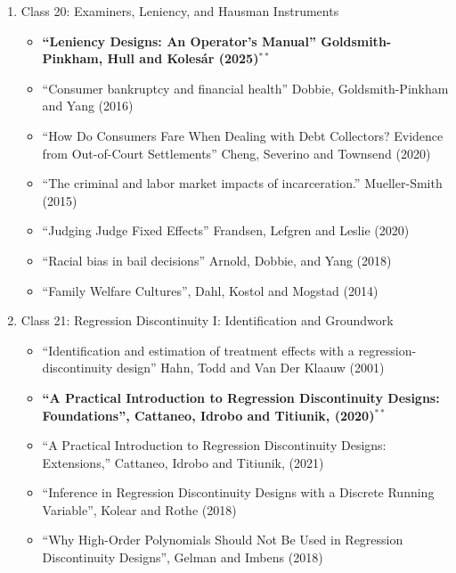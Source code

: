 \documentclass[11pt, a4paper]{article}
\begin{document}
\begin{enumerate}
\begin{enumerate}
\begin{itemize}
    \item ``The Estimation of Treatment Effects in Simulated Instrument Designs'', Aronow, Goldsmith-Pinkham and Sorkin (mimeo)
    \item ``Granular Instrumental Variables'', Gabaix and Koijen (2022)
    \item ``Included and Excluded Instruments in Structural Estimation,'' Andrews, Barahona, Gentzkow, Rambachan, and Shapiro (2022)
    \end{itemize}
  \item Class 20: Examiners, Leniency, and Hausman Instruments
    \begin{itemize}
    \item \textbf{``Leniency Designs: An Operator's Manual'' Goldsmith-Pinkham, Hull and Koles\'ar (2025)}$^{**}$
    \item ``Consumer bankruptcy and financial health'' Dobbie, Goldsmith-Pinkham and Yang (2016)
    \item ``How Do Consumers Fare When Dealing with Debt Collectors? Evidence from Out-of-Court Settlements'' Cheng, Severino and Townsend (2020)
    \item ``The criminal and labor market impacts of incarceration.'' Mueller-Smith (2015)
    \item ``Judging Judge Fixed Effects'' Frandsen, Lefgren and Leslie (2020)
    \item ``Racial bias in bail decisions'' Arnold, Dobbie, and Yang (2018)
    \item ``Family Welfare Cultures'', Dahl, Kostol and Mogstad (2014)
    \end{itemize}
  \item Class 21: Regression Discontinuity I: Identification and Groundwork
    \begin{itemize}
    \item ``Identification and estimation of treatment effects with a regression-discontinuity design'' Hahn, Todd and Van Der Klaauw (2001)
    \item \textbf{``A Practical Introduction to Regression Discontinuity Designs: Foundations'', Cattaneo, Idrobo and Titiunik, (2020)}$^{**}$
    \item ``A Practical Introduction to Regression Discontinuity Designs: Extensions,''  Cattaneo, Idrobo and Titiunik, (2021)
    \item ``Inference in Regression Discontinuity Designs with a Discrete Running Variable'', Kolear and Rothe (2018)
    \item ``Why High-Order Polynomials Should Not Be Used in Regression Discontinuity Designs'', Gelman and Imbens (2018)

\end{itemize}
\end{enumerate}
\end{enumerate}
\end{document}
